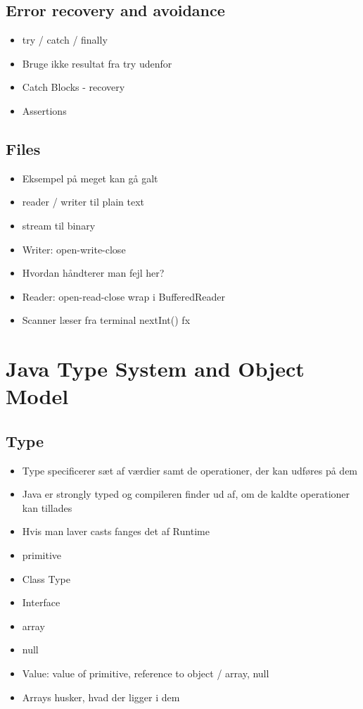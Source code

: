 \subsection{Error recovery and avoidance} %
\label{sub:error_recovery_and_avoidance}
\begin{itemize}
    \item try / catch / finally
    \item Bruge ikke resultat fra try udenfor
    \item Catch Blocks - recovery
    \item Assertions
\end{itemize}
\subsection{Files} %
\label{sub:files}
\begin{itemize}
    \item Eksempel på meget kan gå galt
    \item reader / writer til plain text
    \item stream til binary
    \item Writer: open-write-close
    \item Hvordan håndterer man fejl her?
    \item Reader: open-read-close wrap i BufferedReader
    \item Scanner læser fra terminal nextInt() fx
\end{itemize}
\newpage
\section{Java Type System and Object Model} %
\label{sec:java_type_system_and_object_model}
\subsection{Type} %
\label{sub:type}
\begin{itemize}
    \item Type specificerer sæt af værdier samt de operationer, der kan udføres på dem
    \item Java er strongly typed og compileren finder ud af, om de kaldte operationer kan tillades
    \item Hvis man laver casts fanges det af Runtime
    \item primitive
    \item Class Type
    \item Interface
    \item array
    \item null
    \item Value: value of primitive, reference to object / array, null
    \item Arrays husker, hvad der ligger i dem
\end{itemize}
